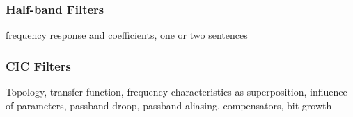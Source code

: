 \begin{frame}
    \frametitle{Half-band Filters}
    \begin{center}
        frequency response and coefficients, one or two sentences
    \end{center}
\end{frame}

\begin{frame}
    \frametitle{CIC Filters}
    \begin{center}
        Topology,    transfer   function,    frequency   characteristics    as
        superposition,  influence  of  parameters,  passband  droop,  passband
        aliasing, compensators, bit growth
    \end{center}
\end{frame}
